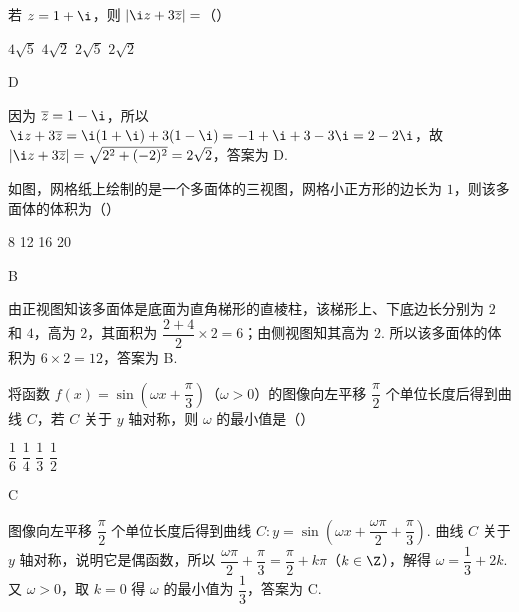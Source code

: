 \begin{problem}
若 \(z=1+\i\)，则 \(\left|\i z+3\overline{z}\right|=\)（\quad）

\choices
    {\(4\sqrt{5}\)}
    {\(4\sqrt{2}\)}
    {\(2\sqrt{5}\)}
    {\(2\sqrt{2}\)}
\end{problem}

\begin{answer}
D
\end{answer}

\begin{solution}
因为 \(\overline{z}=1-\i\)，所以 \(\i z+3\overline{z}=\i(1+\i)+3(1-\i)=-1+\i+3-3\i=2-2\i\)，故 \(\left|\i z+3\overline{z}\right|=\sqrt{2^2+(-2)^2}=2\sqrt2\)，答案为 D.
\end{solution}

\begin{problem}
如图，网格纸上绘制的是一个多面体的三视图，网格小正方形的边长为 \(1\)，则该多面体的体积为（\quad）


\choices
    {8}
    {12}
    {16}
    {20}
\end{problem}

\begin{answer}
B
\end{answer}

\begin{solution}
由正视图知该多面体是底面为直角梯形的直棱柱，该梯形上、下底边长分别为 \(2\) 和 \(4\)，高为 \(2\)，其面积为 \(\dfrac{2+4}{2}\times2=6\)；由侧视图知其高为 \(2\). 所以该多面体的体积为 \(6\times2=12\)，答案为 B.
\end{solution}

\begin{problem}
将函数 \(f(x)=\sin\left(\omega x+\dfrac{\pi}{3}\right)\)（\(\omega>0\)）的图像向左平移 \(\dfrac{\pi}{2}\) 个单位长度后得到曲线 \(C\)，若 \(C\) 关于 \(y\) 轴对称，则 \(\omega\) 的最小值是（\quad）

\choices
    {\(\dfrac{1}{6}\)}
    {\(\dfrac{1}{4}\)}
    {\(\dfrac{1}{3}\)}
    {\(\dfrac{1}{2}\)}
\end{problem}

\begin{answer}
C
\end{answer}

\begin{solution}
图像向左平移 \(\dfrac{\pi}{2}\) 个单位长度后得到曲线 \(C:y=\sin\left(\omega x+\dfrac{\omega\pi}{2}+\dfrac{\pi}{3}\right)\). 曲线 \(C\) 关于 \(y\) 轴对称，说明它是偶函数，所以 \(\dfrac{\omega\pi}{2}+\dfrac{\pi}{3}=\dfrac{\pi}{2}+k\pi\)（\(k\in\Z\)），解得 \(\omega=\dfrac13+2k\). 又 \(\omega>0\)，取 \(k=0\) 得 \(\omega\) 的最小值为 \(\dfrac13\)，答案为 C.
\end{solution}

